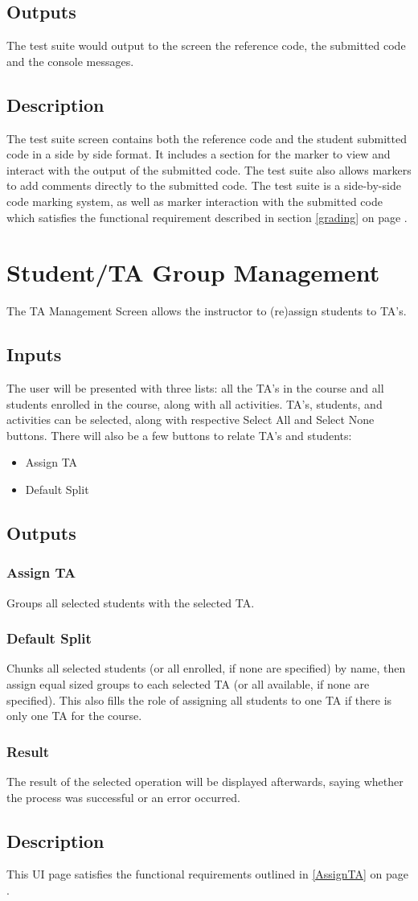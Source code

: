 \documentclass{article}
\begin{document}
\subsection{Outputs}
The test suite would output to the screen the reference code, the submitted code
and the console messages.
\subsection{Description}
The test suite screen contains both the reference code and the student submitted
code in a side by side format.  It includes a section for the marker to view
and interact with the output of the submitted code.  The test suite also allows
markers to add comments directly to the submitted code.  The test suite is a
side-by-side code marking system, as well as marker interaction with the
submitted code which satisfies the functional requirement described in section
\ref{grading} on page \pageref{grading}.

\section{Student/TA Group Management}
The TA Management Screen allows the instructor to (re)assign students to TA's.
\subsection{Inputs}
The user will be presented with three lists: all the TA's in the course and all
students enrolled in the course, along with all activities.  TA's, students, and
activities can be selected, along with respective Select All and Select None
buttons.  There will also be a few buttons to relate TA's and students:
\begin{itemize}
  \item Assign TA
  \item Default Split
\end{itemize}

\subsection{Outputs}
\subsubsection{Assign TA}
Groups all selected students with the selected TA.
\subsubsection{Default Split}
Chunks all selected students (or all enrolled, if none are specified) by name,
then assign equal sized groups to each selected TA (or all available, if none
are specified).  This also fills the role of assigning all students to one TA
if there is only one TA for the course.
\subsubsection{Result}
The result of the selected operation will be displayed afterwards, saying whether
the process was successful or an error occurred.
\subsection{Description}
This UI page satisfies the functional requirements outlined in \ref{AssignTA}
on page \pageref{AssignTA}.
\end{document}
